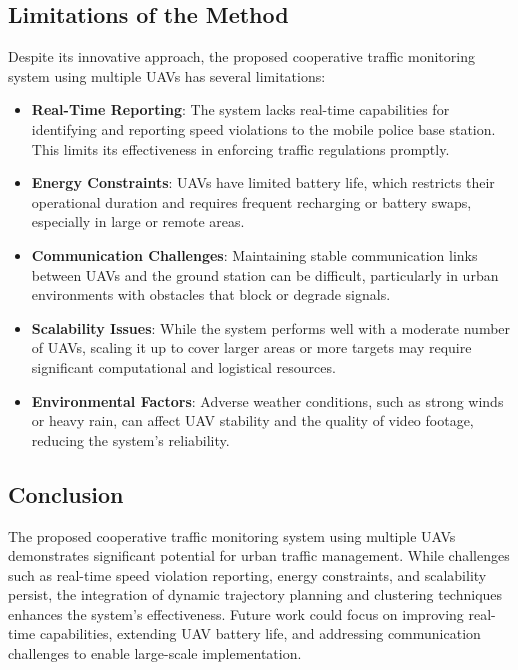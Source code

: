 \vspace{\baselineskip} %

\subsection{Limitations of the Method}
Despite its innovative approach, the proposed cooperative traffic monitoring system using multiple UAVs has several limitations:

\begin{itemize}
    \item \textbf{Real-Time Reporting}: The system lacks real-time capabilities for identifying and reporting speed violations to the mobile police base station. This limits its effectiveness in enforcing traffic regulations promptly.
    \item \textbf{Energy Constraints}: UAVs have limited battery life, which restricts their operational duration and requires frequent recharging or battery swaps, especially in large or remote areas.
    \item \textbf{Communication Challenges}: Maintaining stable communication links between UAVs and the ground station can be difficult, particularly in urban environments with obstacles that block or degrade signals.
    \item \textbf{Scalability Issues}: While the system performs well with a moderate number of UAVs, scaling it up to cover larger areas or more targets may require significant computational and logistical resources.
    \item \textbf{Environmental Factors}: Adverse weather conditions, such as strong winds or heavy rain, can affect UAV stability and the quality of video footage, reducing the system's reliability.
\end{itemize}

\vspace{\baselineskip} %

\subsection{Conclusion}
The proposed cooperative traffic monitoring system using multiple UAVs demonstrates significant potential for urban traffic management. While challenges such as real-time speed violation reporting, energy constraints, and scalability persist, the integration of dynamic trajectory planning and clustering techniques enhances the system's effectiveness. Future work could focus on improving real-time capabilities, extending UAV battery life, and addressing communication challenges to enable large-scale implementation.

